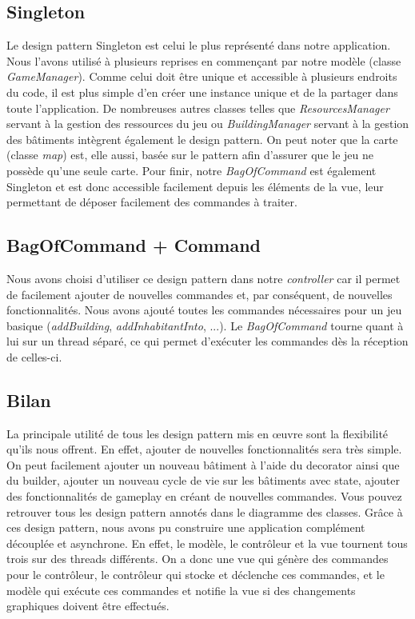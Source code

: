\documentclass{article}
\begin{document}
\subsection{Singleton}
Le design pattern Singleton est celui le plus représenté dans notre application. Nous l'avons utilisé à plusieurs reprises en commençant par
notre modèle (classe \textit{GameManager}). Comme celui doit être unique et accessible à plusieurs endroits du code, il est plus simple d'en créer 
une instance unique et de la partager dans toute l'application. De nombreuses autres classes telles que \textit{ResourcesManager} servant à la gestion
des ressources du jeu ou \textit{BuildingManager} servant à la gestion des bâtiments intègrent également le design pattern. On peut noter que la carte 
(classe \textit{map}) est, elle aussi, basée sur le pattern afin d'assurer que le jeu ne possède qu'une seule carte. Pour finir, notre \textit{BagOfCommand}
est également Singleton et est donc accessible facilement depuis les éléments de la vue, leur permettant de déposer facilement des commandes à traiter.

\subsection{BagOfCommand + Command}
Nous avons choisi d'utiliser ce design pattern dans notre \textit{controller} car il permet de facilement ajouter de nouvelles commandes et, par conséquent,
de nouvelles fonctionnalités. Nous avons ajouté toutes les commandes nécessaires pour un jeu basique (\textit{addBuilding}, \textit{addInhabitantInto}, ...).
Le \textit{BagOfCommand} tourne quant à lui sur un thread séparé, ce qui permet d'exécuter les commandes dès la réception de celles-ci. 

\subsection{Bilan}
La principale utilité de tous les design pattern mis en œuvre sont la flexibilité qu'ils nous offrent. En effet, ajouter de nouvelles fonctionnalités sera
très simple. On peut facilement ajouter un nouveau bâtiment à l'aide du decorator ainsi que du builder, ajouter un nouveau cycle de vie sur les bâtiments 
avec state, ajouter des fonctionnalités de gameplay en créant de nouvelles commandes. Vous pouvez retrouver tous les design pattern annotés dans le diagramme
des classes. Grâce à ces design pattern, nous avons pu construire une application complément découplée et asynchrone. En effet, le modèle, le contrôleur et la vue tournent 
tous trois sur des threads différents. On a donc une vue qui génère des commandes pour le contrôleur, le contrôleur qui stocke et déclenche ces commandes, et le
modèle qui exécute ces commandes et notifie la vue si des changements graphiques doivent être effectués. 
\end{document}

